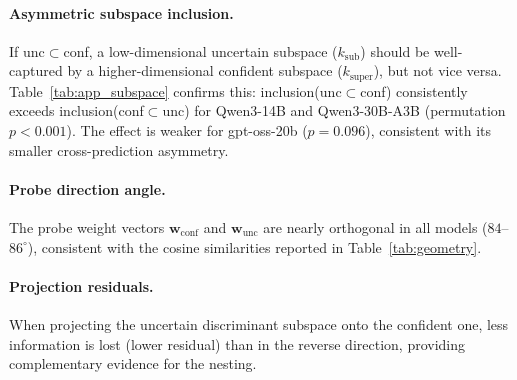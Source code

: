 \documentclass[11pt]{article}
\begin{document}
\paragraph{Asymmetric subspace inclusion.}
If unc$\subset$conf, a low-dimensional uncertain subspace ($k_{\text{sub}}$) should be well-captured by a higher-dimensional confident subspace ($k_{\text{super}}$), but not vice versa.
Table~\ref{tab:app_subspace} confirms this: inclusion(unc$\subset$conf) consistently exceeds inclusion(conf$\subset$unc) for Qwen3-14B and Qwen3-30B-A3B (permutation $p < 0.001$).
The effect is weaker for gpt-oss-20b ($p = 0.096$), consistent with its smaller cross-prediction asymmetry.

\paragraph{Probe direction angle.}
The probe weight vectors $\mathbf{w}_{\text{conf}}$ and $\mathbf{w}_{\text{unc}}$ are nearly orthogonal in all models ($84$--$86^{\circ}$), consistent with the cosine similarities reported in Table~\ref{tab:geometry}.

\paragraph{Projection residuals.}
When projecting the uncertain discriminant subspace onto the confident one, less information is lost (lower residual) than in the reverse direction, providing complementary evidence for the nesting.
\end{document}
